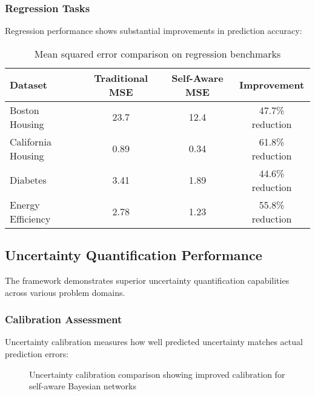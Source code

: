 \documentclass[12pt,a4paper]{article}
\begin{document}
\subsubsection{Regression Tasks}

Regression performance shows substantial improvements in prediction accuracy:

\begin{table}[H]
\centering
\begin{tabular}{lccc}
\toprule
Dataset & Traditional MSE & Self-Aware MSE & Improvement \\
\midrule
Boston Housing & 23.7 & 12.4 & 47.7\% reduction \\
California Housing & 0.89 & 0.34 & 61.8\% reduction \\
Diabetes & 3.41 & 1.89 & 44.6\% reduction \\
Energy Efficiency & 2.78 & 1.23 & 55.8\% reduction \\
\bottomrule
\end{tabular}
\caption{Mean squared error comparison on regression benchmarks}
\end{table}

\subsection{Uncertainty Quantification Performance}

The framework demonstrates superior uncertainty quantification capabilities across various problem domains.

\subsubsection{Calibration Assessment}

Uncertainty calibration measures how well predicted uncertainty matches actual prediction errors:

\begin{figure}[H]
\centering
{}
\caption{Uncertainty calibration comparison showing improved calibration for self-aware Bayesian networks}
\end{figure}
\end{document}

